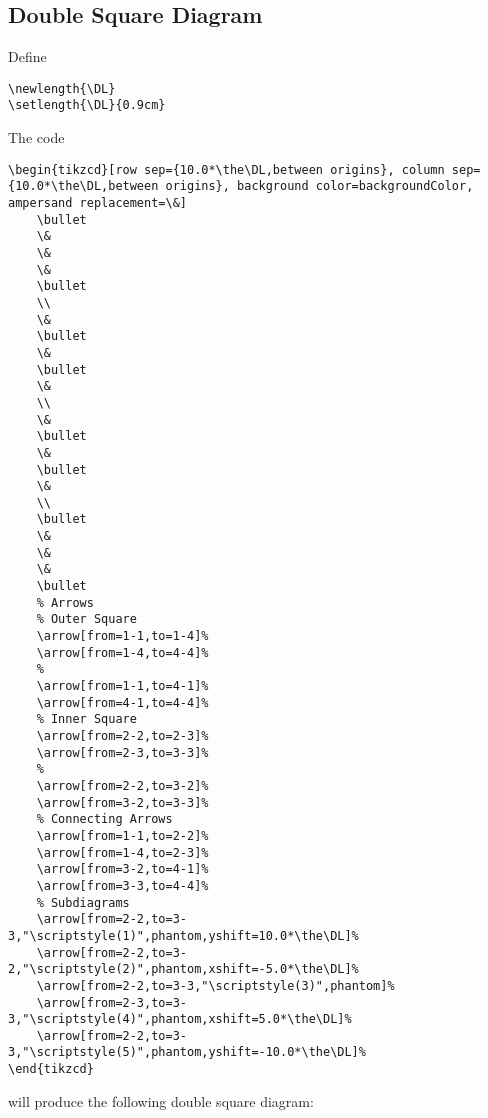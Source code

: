 \subsection{Double Square Diagram}\label{subsection-tikz-code-for-commutative-diagrams-double-square-diagram}
Define
\begin{verbatim}
\newlength{\DL}
\setlength{\DL}{0.9cm}
\end{verbatim}
The code
\begin{verbatim}
\begin{tikzcd}[row sep={10.0*\the\DL,between origins}, column sep={10.0*\the\DL,between origins}, background color=backgroundColor, ampersand replacement=\&]
    \bullet
    \&
    \&
    \&
    \bullet
    \\
    \&
    \bullet
    \&
    \bullet
    \&
    \\
    \&
    \bullet
    \&
    \bullet
    \&
    \\
    \bullet
    \&
    \&
    \&
    \bullet
    % Arrows
    % Outer Square
    \arrow[from=1-1,to=1-4]%
    \arrow[from=1-4,to=4-4]%
    %
    \arrow[from=1-1,to=4-1]%
    \arrow[from=4-1,to=4-4]%
    % Inner Square
    \arrow[from=2-2,to=2-3]%
    \arrow[from=2-3,to=3-3]%
    %
    \arrow[from=2-2,to=3-2]%
    \arrow[from=3-2,to=3-3]%
    % Connecting Arrows
    \arrow[from=1-1,to=2-2]%
    \arrow[from=1-4,to=2-3]%
    \arrow[from=3-2,to=4-1]%
    \arrow[from=3-3,to=4-4]%
    % Subdiagrams
    \arrow[from=2-2,to=3-3,"\scriptstyle(1)",phantom,yshift=10.0*\the\DL]%
    \arrow[from=2-2,to=3-2,"\scriptstyle(2)",phantom,xshift=-5.0*\the\DL]%
    \arrow[from=2-2,to=3-3,"\scriptstyle(3)",phantom]%
    \arrow[from=2-3,to=3-3,"\scriptstyle(4)",phantom,xshift=5.0*\the\DL]%
    \arrow[from=2-2,to=3-3,"\scriptstyle(5)",phantom,yshift=-10.0*\the\DL]%
\end{tikzcd}
\end{verbatim}
will produce the following double square diagram:
